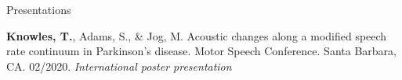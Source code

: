 \documentclass{resume} %
\begin{document}
\begin{rSection}{Presentations}
\begin{etaremune}
\item {\bf Knowles, T.}, Adams, S., \& Jog, M. Acoustic changes along a modified speech rate continuum in Parkinson's disease. Motor Speech Conference. Santa Barbara, CA. 02/2020. \emph{International poster presentation}
%
%	
%	
%
%	
%	

\end{etaremune}
\end{rSection}
\end{document}
